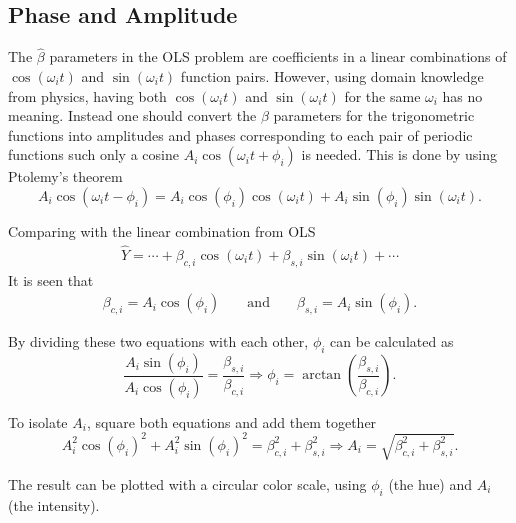 \subsection{Phase and Amplitude}

The $\hat{\beta}$ parameters in the OLS problem are coefficients in a linear combinations of $\cos(\omega_i t)$ and $\sin(\omega_i t)$ function pairs.
However, using domain knowledge from physics, having both $\cos(\omega_i t)$ and $\sin(\omega_i t)$ for the same $\omega_i$ has no meaning.
Instead one should convert the $\beta$ parameters for the trigonometric functions into amplitudes and phases corresponding to each pair of periodic functions such only a cosine  $A_i \cos(\omega_i t + \phi_i)$ is needed.
This is done by using Ptolemy's theorem
\begin{equation}
A_i \cos(\omega_i t - \phi_i) = A_i \cos(\phi_i) \cos(\omega_i t) + A_i \sin(\phi_i) \sin(\omega_i t).
\end{equation}

Comparing with the linear combination from OLS
\begin{align}
\hat{Y} = \cdots + \beta_{c,i} \cos(\omega_i t) + \beta_{s,i} \sin(\omega_i t) + \cdots
\end{align}
It is seen that
\begin{align}
\beta_{c,i} = A_i \cos(\phi_i) && \text{ and } && \beta_{s,i} = A_i \sin(\phi_i).
\end{align}

By dividing these two equations with each other, $\phi_i$ can be calculated as 
\begin{equation}
\frac{A_i \sin(\phi_i)}{A_i \cos(\phi_i)} = \frac{\beta_{s,i}}{\beta_{c,i}} \Rightarrow \phi_i = \arctan\left(\frac{\beta_{s,i}}{\beta_{c,i}}\right).
\end{equation}

To isolate $A_i$, square both equations and add them together
\begin{equation}
A_i^2 \cos(\phi_i)^2 + A_i^2 \sin(\phi_i)^2 = \beta_{c,i}^2 + \beta_{s,i}^2 \Rightarrow A_i = \sqrt{\beta_{c,i}^2 + \beta_{s,i}^2}.
\end{equation}

The result can be plotted with a circular color scale, using $\phi_i$ (the hue) and $A_i$ (the intensity).
